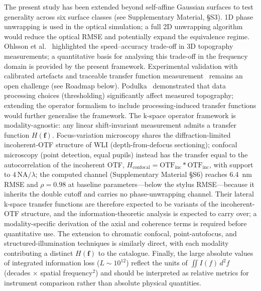 \documentclass[review,12pt]{elsarticle}
\begin{document}
The present study has been extended beyond self-affine Gaussian surfaces to test generality across six surface classes (see Supplementary Material, \S S3). 1D phase unwrapping is used in the optical simulation; a full 2D unwrapping algorithm would reduce the optical RMSE and potentially expand the equivalence regime. Ohlsson et al.~\cite{ohlsson2001accuracy} highlighted the speed--accuracy trade-off in 3D topography measurements; a quantitative basis for analysing this trade-off in the frequency domain is provided by the present framework. Experimental validation with calibrated artefacts and traceable transfer function measurement~\cite{yashchuk2015binary} remains an open challenge (see Roadmap below). Podulka~\cite{podulka2022thresholding} demonstrated that data processing choices (thresholding) significantly affect measured topography; extending the operator formalism to include processing-induced transfer functions would further generalise the framework. The k-space operator framework is modality-agnostic: any linear shift-invariant measurement admits a transfer function $H(\mathbf{f})$. Focus-variation microscopy shares the diffraction-limited incoherent-OTF structure of WLI (depth-from-defocus sectioning); confocal microscopy (point detection, equal pupils) instead has the transfer equal to the autocorrelation of the incoherent OTF, $H_\mathrm{confocal} = \mathrm{OTF}_\mathrm{inc} \ast \mathrm{OTF}_\mathrm{inc}$, with support to $4\,\mathrm{NA}/\lambda$; the computed channel (Supplementary Material \S S6) reaches \SI{6.4}{nm} RMSE and $\rho=0.98$ at baseline parameters---below the stylus RMSE---because it inherits the double cutoff and carries no phase-unwrapping channel. Their lateral k-space transfer functions are therefore expected to be variants of the incoherent-OTF structure, and the information-theoretic analysis is expected to carry over; a modality-specific derivation of the axial and coherence terms is required before quantitative use. The extension to chromatic confocal, point-autofocus, and structured-illumination techniques is similarly direct, with each modality contributing a distinct $H(\mathbf{f})$ to the catalogue. Finally, the large absolute values of integrated information loss ($L \sim 10^{12}$) reflect the units of $\iint I(f)\,d^2f$ (decades $\times$ spatial frequency$^{2}$) and should be interpreted as relative metrics for instrument comparison rather than absolute physical quantities.
\end{document}
